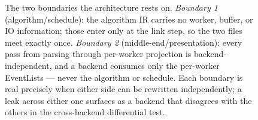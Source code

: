 \begin{figure}[tbp]
  \caption[The two architectural boundaries]{The two boundaries the architecture
    rests on. \emph{Boundary 1} (algorithm/schedule): the algorithm IR carries no
    worker, buffer, or IO information; those enter only at the link step, so the
    two files meet exactly once. \emph{Boundary 2} (middle-end/presentation):
    every pass from parsing through per-worker projection is backend-independent,
    and a backend consumes only the per-worker EventLists --- never the algorithm
    or schedule. Each boundary is real precisely when either side can be rewritten
    independently; a leak across either one surfaces as a backend that disagrees
    with the others in the cross-backend differential test.}
  \label{fig:boundaries}
\end{figure}
